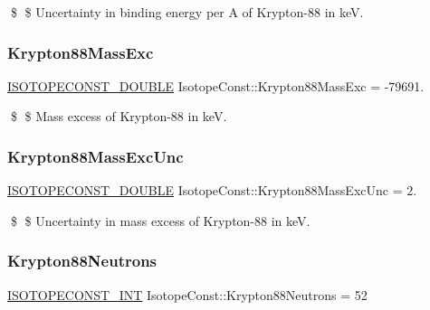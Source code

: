 \$ \$ Uncertainty in binding energy per A of Krypton-\/88 in keV. \mbox{\label{group___isotope_const-_krypton-_kr88_gaa7e9679b5c886d955bd1f85b2ab74600}} 
\subsubsection{\texorpdfstring{Krypton88\+Mass\+Exc}{Krypton88MassExc}}
{\footnotesize\ttfamily \mbox{\hyperlink{group___isotope_const-_macros_ga8f45a7272ce02c0b4c65c44636ed719a}{I\+S\+O\+T\+O\+P\+E\+C\+O\+N\+S\+T\+\_\+\+D\+O\+U\+B\+LE}} Isotope\+Const\+::\+Krypton88\+Mass\+Exc = -\/79691.}

\$ \$ Mass excess of Krypton-\/88 in keV. \mbox{\label{group___isotope_const-_krypton-_kr88_ga1973768382bd4b849803d8715ce46145}} 
\subsubsection{\texorpdfstring{Krypton88\+Mass\+Exc\+Unc}{Krypton88MassExcUnc}}
{\footnotesize\ttfamily \mbox{\hyperlink{group___isotope_const-_macros_ga8f45a7272ce02c0b4c65c44636ed719a}{I\+S\+O\+T\+O\+P\+E\+C\+O\+N\+S\+T\+\_\+\+D\+O\+U\+B\+LE}} Isotope\+Const\+::\+Krypton88\+Mass\+Exc\+Unc = 2.}

\$ \$ Uncertainty in mass excess of Krypton-\/88 in keV. \mbox{\label{group___isotope_const-_krypton-_kr88_ga18989ed49716f78db61e0430ea20c1b8}} 
\subsubsection{\texorpdfstring{Krypton88\+Neutrons}{Krypton88Neutrons}}
{\footnotesize\ttfamily \mbox{\hyperlink{group___isotope_const-_macros_ga5f18360b3e99483a35c32d789e62621c}{I\+S\+O\+T\+O\+P\+E\+C\+O\+N\+S\+T\+\_\+\+I\+NT}} Isotope\+Const\+::\+Krypton88\+Neutrons = 52}


